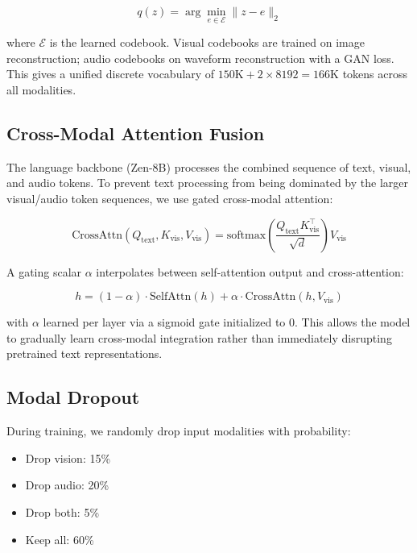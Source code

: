 \documentclass[11pt,a4paper]{article}
\begin{document}
\begin{equation}
q(z) = \arg\min_{e \in \mathcal{E}} \|z - e\|_2
\end{equation}

where $\mathcal{E}$ is the learned codebook. Visual codebooks are trained on
image reconstruction; audio codebooks on waveform reconstruction with a GAN loss.
This gives a unified discrete vocabulary of $150\text{K} + 2\times8192 = 166\text{K}$
tokens across all modalities.

\subsection{Cross-Modal Attention Fusion}

The language backbone (Zen-8B) processes the combined sequence of text, visual,
and audio tokens. To prevent text processing from being dominated by the larger
visual/audio token sequences, we use gated cross-modal attention:

\begin{equation}
\text{CrossAttn}(Q_\text{text}, K_\text{vis}, V_\text{vis}) = \text{softmax}\left(\frac{Q_\text{text} K_\text{vis}^\top}{\sqrt{d}}\right) V_\text{vis}
\end{equation}

A gating scalar $\alpha$ interpolates between self-attention output and cross-attention:

\begin{equation}
h = (1 - \alpha) \cdot \text{SelfAttn}(h) + \alpha \cdot \text{CrossAttn}(h, V_\text{vis})
\end{equation}

with $\alpha$ learned per layer via a sigmoid gate initialized to 0. This allows
the model to gradually learn cross-modal integration rather than immediately
disrupting pretrained text representations.

\subsection{Modal Dropout}

During training, we randomly drop input modalities with probability:
\begin{itemize}
  \item Drop vision: 15\%
  \item Drop audio: 20\%
  \item Drop both: 5\%
  \item Keep all: 60\%
\end{itemize}
\end{document}
